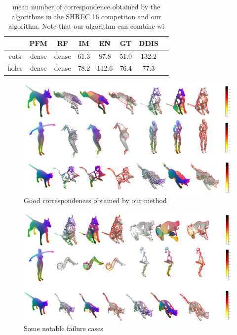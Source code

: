 \documentclass[10pt,twocolumn,letterpaper]{article}
\begin{document}
\begin{table}[h]
	\centering
	\begin{tabular}{c  c  c  c  c  c  c c} 
		\hline
		& PFM & RF & IM & EN & GT & DDIS  \\ \hline
		cuts & dense & dense & 61.3 & 87.8 & 51.0 & 132.2\\ \hline
		holes & dense & dense & 78.2 & 112.6 & 76.4 & 77.3 \\ \hline
		
	\end{tabular}
	\caption{mean number of correspondence obtained by the algorithms in the SHREC 16 competiton and our algorithm. Note that our algorithm can combine wi}
	\label{table:1}
\end{table}

\begin{figure}[htb]
	\centering

	\includegraphics[width=1\textwidth]{figures/success_1}
	\caption{Good correspondences obtained by our method}
\end{figure}


\begin{figure}[htb]
	\centering
	\includegraphics[width=1\textwidth]{figures/fail2.png}
	\caption{Some notable failure cases}
\end{figure}
\end{document}
